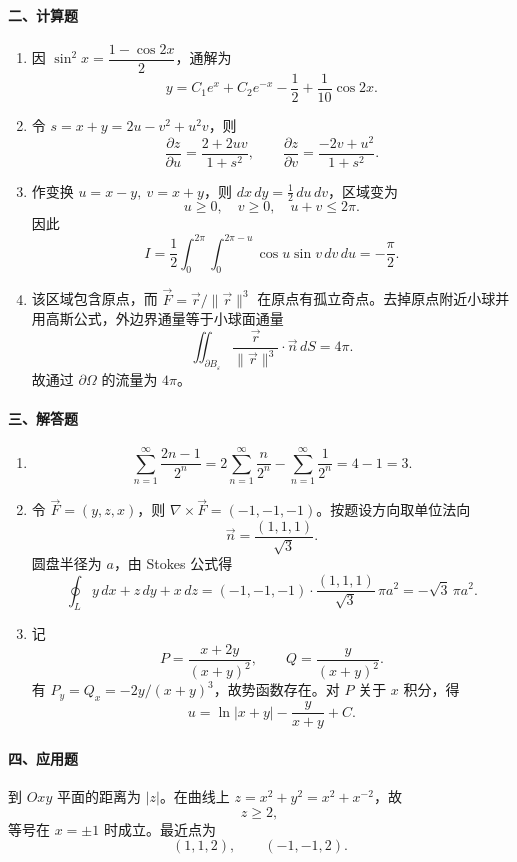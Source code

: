 \paragraph*{二、计算题}
\begin{enumerate}
  \item 因 $\sin^2x=\dfrac{1-\cos2x}{2}$，通解为
  \[
    y=C_1e^x+C_2e^{-x}-\frac12+\frac1{10}\cos2x.
  \]
  \item 令 $s=x+y=2u-v^2+u^2v$，则
  \[
    \frac{\partial z}{\partial u}
    =\frac{2+2uv}{1+s^2},\qquad
    \frac{\partial z}{\partial v}
    =\frac{-2v+u^2}{1+s^2}.
  \]
  \item 作变换 $u=x-y,\ v=x+y$，则 $dx\,dy=\frac12\,du\,dv$，区域变为
  \[
    u\ge0,\quad v\ge0,\quad u+v\le2\pi.
  \]
  因此
  \[
    I=\frac12\int_0^{2\pi}\int_0^{2\pi-u}\cos u\sin v\,dv\,du
    =-\frac{\pi}{2}.
  \]
  \item 该区域包含原点，而 $\vec F=\vec r/\|\vec r\|^3$ 在原点有孤立奇点。去掉原点附近小球并用高斯公式，外边界通量等于小球面通量
  \[
    \iint_{\partial B_\varepsilon}\frac{\vec r}{\|\vec r\|^3}\cdot\vec n\,dS=4\pi.
  \]
  故通过 $\partial\Omega$ 的流量为 $4\pi$。
\end{enumerate}

\paragraph*{三、解答题}
\begin{enumerate}
  \item
  \[
    \sum_{n=1}^\infty\frac{2n-1}{2^n}
    =2\sum_{n=1}^\infty\frac{n}{2^n}-\sum_{n=1}^\infty\frac1{2^n}
    =4-1=3.
  \]
  \item 令 $\vec F=(y,z,x)$，则 $\nabla\times\vec F=(-1,-1,-1)$。按题设方向取单位法向
  \[
    \vec n=\frac{(1,1,1)}{\sqrt3}.
  \]
  圆盘半径为 $a$，由 Stokes 公式得
  \[
    \oint_L y\,dx+z\,dy+x\,dz
    =(-1,-1,-1)\cdot\frac{(1,1,1)}{\sqrt3}\,\pi a^2
    =-\sqrt3\,\pi a^2.
  \]
  \item 记
  \[
    P=\frac{x+2y}{(x+y)^2},\qquad Q=\frac{y}{(x+y)^2}.
  \]
  有 $P_y=Q_x=-2y/(x+y)^3$，故势函数存在。对 $P$ 关于 $x$ 积分，得
  \[
    u=\ln|x+y|-\frac{y}{x+y}+C.
  \]
\end{enumerate}

\paragraph*{四、应用题}
到 $Oxy$ 平面的距离为 $|z|$。在曲线上 $z=x^2+y^2=x^2+x^{-2}$，故
\[
  z\ge2,
\]
等号在 $x=\pm1$ 时成立。最近点为
\[
  (1,1,2),\qquad (-1,-1,2).
\]

